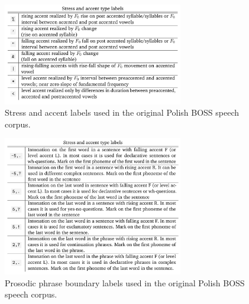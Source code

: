 \documentclass[a4paper,9pt]{beamer}
\theoremstyle{mytheoremstyle}
\begin{document}
\begin{frame}
\begin{figure}
\begin{center}
  \includegraphics[width=0.7\textwidth]{res/stress_accent_labels}
\end{center}
	\caption{Stress and accent labels used in the original Polish BOSS speech corpus.}
\end{figure}
\end{frame}

\begin{frame}
\begin{figure}
\begin{center}
  \includegraphics[width=0.7\textwidth]{res/boundary_tones}
\end{center}
	\caption{Prosodic phrase boundary labels used in the original Polish BOSS speech corpus.}
\end{figure}
\end{frame}
\end{document}

